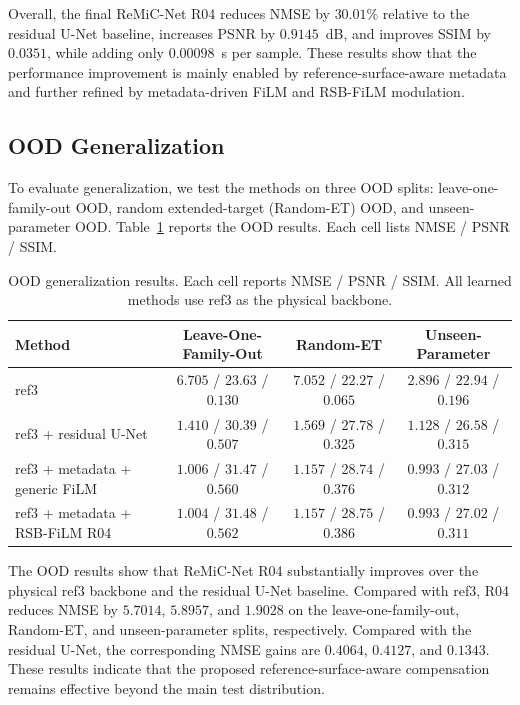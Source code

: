 \documentclass[journal]{IEEEtran}
\begin{document}
Overall, the final ReMiC-Net R04 reduces NMSE by $30.01\%$ relative to the residual U-Net baseline, increases PSNR by $0.9145$~dB, and improves SSIM by $0.0351$, while adding only $0.00098$~s per sample. These results show that the performance improvement is mainly enabled by reference-surface-aware metadata and further refined by metadata-driven FiLM and RSB-FiLM modulation.

\subsection{OOD Generalization}
\label{subsec:ood_generalization}

To evaluate generalization, we test the methods on three OOD splits: leave-one-family-out OOD, random extended-target (Random-ET) OOD, and unseen-parameter OOD. Table~\ref{tab:ood_results} reports the OOD results. Each cell lists NMSE / PSNR / SSIM.

\begin{table}[!t]
\centering
\caption{OOD generalization results. Each cell reports NMSE / PSNR / SSIM. All learned methods use ref3 as the physical backbone.}
\label{tab:ood_results}
\renewcommand{\arraystretch}{1.10}
\begin{tabular}{lccc}
\hline
Method & Leave-One-Family-Out & Random-ET & Unseen-Parameter \\
\hline
ref3 & $6.705$ / $23.63$ / $0.130$ & $7.052$ / $22.27$ / $0.065$ & $2.896$ / $22.94$ / $0.196$ \\
ref3 + residual U-Net & $1.410$ / $30.39$ / $0.507$ & $1.569$ / $27.78$ / $0.325$ & $1.128$ / $26.58$ / $0.315$ \\
ref3 + metadata + generic FiLM & $1.006$ / $31.47$ / $0.560$ & $1.157$ / $28.74$ / $0.376$ & $0.993$ / $27.03$ / $0.312$ \\
ref3 + metadata + RSB-FiLM R04 & $\mathbf{1.004}$ / $\mathbf{31.48}$ / $\mathbf{0.562}$ & $1.157$ / $\mathbf{28.75}$ / $\mathbf{0.386}$ & $0.993$ / $27.02$ / $0.311$ \\
\hline
\end{tabular}
\end{table}

The OOD results show that ReMiC-Net R04 substantially improves over the physical ref3 backbone and the residual U-Net baseline. Compared with ref3, R04 reduces NMSE by $5.7014$, $5.8957$, and $1.9028$ on the leave-one-family-out, Random-ET, and unseen-parameter splits, respectively. Compared with the residual U-Net, the corresponding NMSE gains are $0.4064$, $0.4127$, and $0.1343$. These results indicate that the proposed reference-surface-aware compensation remains effective beyond the main test distribution.
\end{document}
